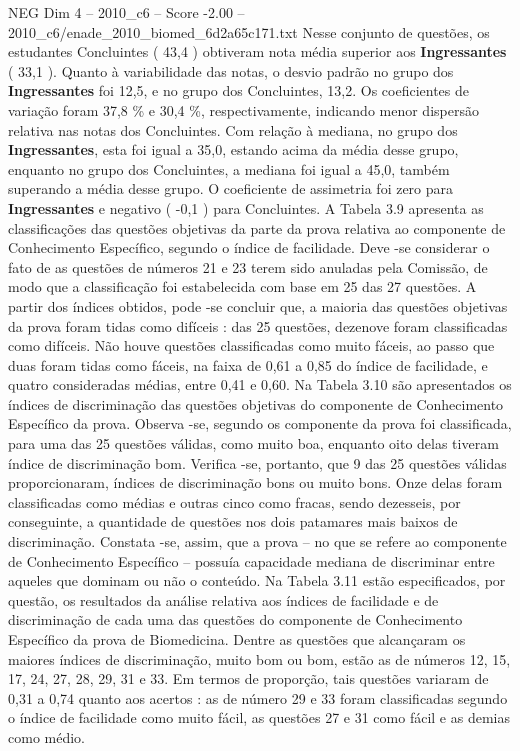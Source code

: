 \begin{textsample}{NEG Dim 4 – 2010\_c6 – Score -2.00 – 2010\_c6/enade\_2010\_biomed\_6d2a65c171.txt}
Nesse conjunto de questões, os estudantes Concluintes ( 43,4 ) obtiveram nota média superior aos \textbf{Ingressantes} ( 33,1 ).
Quanto à variabilidade das notas, o desvio padrão no grupo dos \textbf{Ingressantes} foi 12,5, e no grupo dos Concluintes, 13,2.
Os coeficientes de variação foram 37,8 \% e 30,4 \%, respectivamente, indicando menor dispersão relativa nas notas dos Concluintes.
Com relação à mediana, no grupo dos \textbf{Ingressantes}, esta foi igual a 35,0, estando acima da média desse grupo, enquanto no grupo dos Concluintes, a mediana foi igual a 45,0, também superando a média desse grupo.
O coeficiente de assimetria foi zero para \textbf{Ingressantes} e negativo ( -0,1 ) para Concluintes.
A Tabela 3.9 apresenta as classificações das questões objetivas da parte da prova relativa ao componente de Conhecimento Específico, segundo o índice de facilidade.
Deve -se considerar o fato de as questões de números 21 e 23 terem sido anuladas pela Comissão, de modo que a classificação foi estabelecida com base em 25 das 27 questões.
A partir dos índices obtidos, pode -se concluir que, a maioria das questões objetivas da prova foram tidas como difíceis : das 25 questões, dezenove foram classificadas como difíceis.
Não houve questões classificadas como muito fáceis, ao passo que duas foram tidas como fáceis, na faixa de 0,61 a 0,85 do índice de facilidade, e quatro consideradas médias, entre 0,41 e 0,60.
Na Tabela 3.10 são apresentados os índices de discriminação das questões objetivas do componente de Conhecimento Específico da prova.
Observa -se, segundo os componente da prova foi classificada, para uma das 25 questões válidas, como muito boa, enquanto oito delas tiveram índice de discriminação bom.
Verifica -se, portanto, que 9 das 25 questões válidas proporcionaram, índices de discriminação bons ou muito bons.
Onze delas foram classificadas como médias e outras cinco como fracas, sendo dezesseis, por conseguinte, a quantidade de questões nos dois patamares mais baixos de discriminação.
Constata -se, assim, que a prova – no que se refere ao componente de Conhecimento Específico – possuía capacidade mediana de discriminar entre aqueles que dominam ou não o conteúdo.
Na Tabela 3.11 estão especificados, por questão, os resultados da análise relativa aos índices de facilidade e de discriminação de cada uma das questões do componente de Conhecimento Específico da prova de Biomedicina.
Dentre as questões que alcançaram os maiores índices de discriminação, muito bom ou bom, estão as de números 12, 15, 17, 24, 27, 28, 29, 31 e 33.
Em termos de proporção, tais questões variaram de 0,31 a 0,74 quanto aos acertos : as de número 29 e 33 foram classificadas segundo o índice de facilidade como muito fácil, as questões 27 e 31 como fácil e as demias como médio.

\end{textsample}
